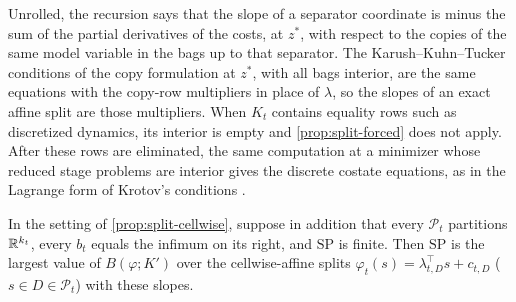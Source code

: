 Unrolled, the recursion says that the slope of a separator coordinate is minus the sum of the partial derivatives of the costs, at $z^*$, with respect to the copies of the same model variable in the bags up to that separator.
The Karush--Kuhn--Tucker conditions of the copy formulation at $z^*$, with all bags interior, are the same equations with the copy-row multipliers in place of $\lambda$, so the slopes of an exact affine split are those multipliers.
When $K_t$ contains equality rows such as discretized dynamics, its interior is empty and \cref{prop:split-forced} does not apply.
After these rows are eliminated, the same computation at a minimizer whose reduced stage problems are interior gives the discrete costate equations, as in the Lagrange form of Krotov's conditions \citep{krotov1967-sufficient-conditions-for-the-optimality}.

\begin{proposition}\label{prop:split-cellwise-best}
In the setting of \cref{prop:split-cellwise}, suppose in addition that every $\mathcal P_t$ partitions $\mathbb{R}^{k_t}$, every $b_t$ equals the infimum on its right, and $\mathrm{SP}$ is finite.
Then $\mathrm{SP}$ is the largest value of $B(\varphi;K')$ over the cellwise-affine splits $\varphi_t(s)=\lambda_{t,D}^\top s+c_{t,D}$ ($s\in D\in\mathcal P_t$) with these slopes.
\end{proposition}

